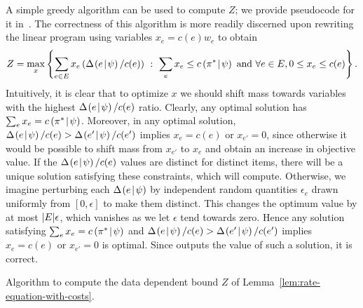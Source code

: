 A simple greedy algorithm can be used to compute $Z$; we provide
pseudocode for it in~.
The correctness of this algorithm is more readily discerned upon rewriting
the linear program using variables $x_e = c(e) w_e$ to obtain 
$$Z = \max_x \left\{ \sum_{e \in E} x_e  \left( {\Delta \hspace{-0.3mm} \left( { {e}\! \mid \! {{\color{black}{\ensuremath{\psi}}}} } \right)  /c(e)} \right)  \ :
  \ \sum_e
  x_e \le c \left( { {\pi^*} \! \mid \! {{\color{black}{\ensuremath{\psi}}}} } \right)  \text{ and } \forall e \in E, 0
  \le x_e \le c(e)\right\}.$$
Intuitively, it is clear that to optimize $x$ we should shift mass
towards variables with the highest $\Delta \hspace{-0.3mm} \left( { {e}\! \mid \! {{\color{black}{\ensuremath{\psi}}}} } \right)  /c(e)$ ratio.
Clearly, any optimal solution has $\sum_e x_e = c \left( { {\pi^*} \! \mid \! {{\color{black}{\ensuremath{\psi}}}} } \right)  $. 
Moreover, in any optimal solution, 
$\Delta \hspace{-0.3mm} \left( { {e}\! \mid \! {{\color{black}{\ensuremath{\psi}}}} } \right)  /c(e) > \Delta \hspace{-0.3mm} \left( { {e'}\! \mid \! {{\color{black}{\ensuremath{\psi}}}} } \right)  /c(e')$ implies 
$x_e = c(e)$ or $x_{e'} = 0$, 
since otherwise it would be possible to shift mass from $x_{e'}$ to
$x_{e}$ and obtain an increase in objective value.
If the $\Delta \hspace{-0.3mm} \left( { {e}\! \mid \! {{\color{black}{\ensuremath{\psi}}}} } \right)  /c(e)$ values are distinct for distinct items,
there will be a unique solution satisfying these constraints, which 
 will compute.
Otherwise, we imagine perturbing each $\Delta \hspace{-0.3mm} \left( { {e}\! \mid \! {{\color{black}{\ensuremath{\psi}}}} } \right)  $ by 
independent random quantities $\epsilon_e$ drawn uniformly from
$[0,\epsilon]$ to make them distinct.  This changes the optimum value
by at most $|E| \epsilon$, which vanishes as we let $\epsilon $ tend
towards zero.  Hence any solution satisfying $\sum_e x_e = c \left( { {\pi^*} \! \mid \! {{\color{black}{\ensuremath{\psi}}}} } \right)   $
and $\Delta \hspace{-0.3mm} \left( { {e}\! \mid \! {{\color{black}{\ensuremath{\psi}}}} } \right)  /c(e) > \Delta \hspace{-0.3mm} \left( { {e'}\! \mid \! {{\color{black}{\ensuremath{\psi}}}} } \right)  /c(e')$ implies 
$x_e = c(e)$ or $x_{e'} = 0$ is optimal.
Since  outputs the value of such a
solution, it is correct.
%
%



%
%
%


%
%
%
%

%
%
%
%
%
%
%
%
%
%

\begin{algorithm}
 \label{alg:data-dependent-bound} \caption{Algorithm to compute the
   data dependent bound $Z$ of Lemma~\ref{lem:rate-equation-with-costs}.}
\end{algorithm}

